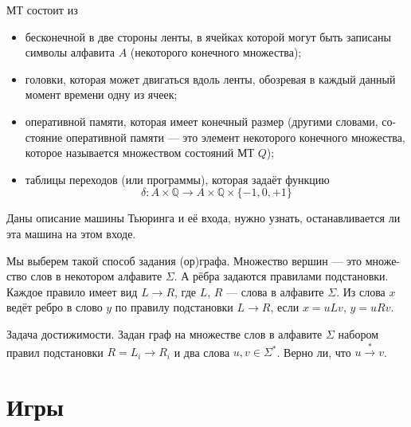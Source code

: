 \documentclass{article}
\newcommand{\Q}{\mathbb{Q}}
\newenvironment{definition}[2][Определение]{\begin{trivlist}
\item[\hskip \labelsep {\bfseries #1}\hskip \labelsep {\bfseries #2}]}{\end{trivlist}}
\begin{document}
\begin{definition}{МТ}
МТ состоит из
\begin{itemize}
\item бесконечной в две стороны ленты, в ячейках которой могут быть записаны
символы алфавита $A$ (некоторого конечного множества);
\item головки, которая может двигаться вдоль ленты, обозревая в каждый данный
момент времени одну из ячеек;
\item оперативной памяти, которая имеет конечный размер (другими словами, со-
стояние оперативной памяти — это элемент некоторого конечного множества,
которое называется множеством состояний МТ $Q$);
\item таблицы переходов (или программы), которая задаёт функцию
\[
\delta : A \times \Q \to A \times \Q \times \{-1, 0, +1\}
\]
\end{itemize}
\end{definition}

\begin{definition}{Проблема остановки}
Даны описание машины Тьюринга и её входа,
нужно узнать, останавливается ли эта машина на этом входе.
\end{definition}

\begin{definition}{Граф подстановок.}
Мы выберем такой способ задания (ор)графа. Множество вершин — это множе-
ство слов в некотором алфавите $\Sigma$. А рёбра задаются правилами подстановки. Каждое правило имеет вид
$L \to R$,
где $L$, $R$ --- слова в алфавите $\Sigma$. Из слова $x$ ведёт ребро в слово $y$ по правилу подстановки $L \to R$, если $x = uLv$, $y = uRv$.
\end{definition}

\begin{definition}{Проблема остановки.}
Задача достижимости. Задан граф на множестве слов в алфавите $\Sigma$ набором
правил подстановки $R = {L_i \to R_i}$ и два слова $u, v \in \Sigma^{*}$. 
Верно ли, что $u \stackrel{*}{\to} v$.
\end{definition}

\section{Игры}
\end{document}
